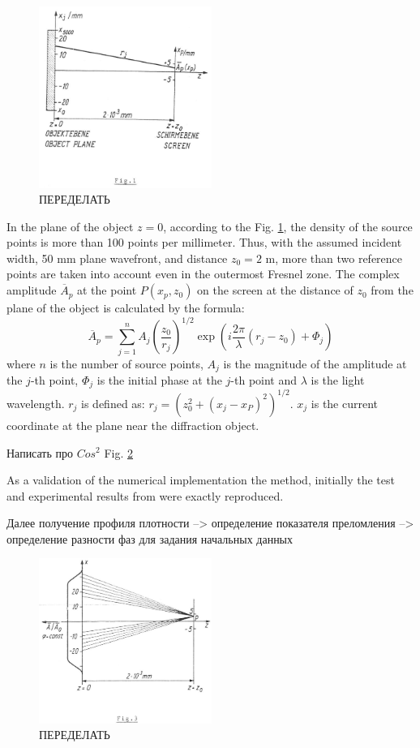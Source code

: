\documentclass{aip-cp}
\begin{document}
\begin{figure}
    \centerline{\includegraphics[width=160pt]{figures/fig1.png}}
\caption{ПЕРЕДЕЛАТЬ}
\label{fig1}
\end{figure}

In the plane of the object $z=0$, according to the Fig. \ref{fig1}, the density of the source points is more than 100 points per millimeter. Thus, with the assumed incident width, 50 mm plane wavefront, and distance $z_0 = 2$ m, more than two reference points are taken into account even in the outermost Fresnel zone. The complex amplitude $\overline{A}_p$ at the point $P{(x_p, z_0)}$ on the screen at the distance of $z_0$ from the plane of the object is calculated by the formula:
\begin{equation}
\overline{A}_p = \sum_{j=1}^{n} A_j \left(\frac{z_0}{r_j} \right)^{1/2} \exp \left(i \frac{2\pi}{\lambda} \left(r_j - z_0\right) + \Phi_j\right)
\end{equation}
where $n$ is the number of source points, $A_j$ is the magnitude of the amplitude at the $j$-th point, $\Phi_j$ is the initial phase at the $j$-th point and $\lambda$ is the light wavelength. $r_j$ is  defined as: $r_j = \left(z_0^2 + \left(x_j - x_P\right)^2\right)^{1/2}$. $x_j$ is the current coordinate at the plane near the diffraction object.

Написать про $Cos^2$ Fig. \ref{fig3}

As a validation of the numerical implementation the method, initially the test and experimental results from \cite{Pfeifer} were exactly reproduced.


Далее получение профиля плотности --> определение показателя преломления --> определение разности фаз для задания начальных данных

\begin{figure}
    \centerline{\includegraphics[width=160pt]{figures/fig3.png}}
\caption{ПЕРЕДЕЛАТЬ}
\label{fig3}
\end{figure}
\end{document}
